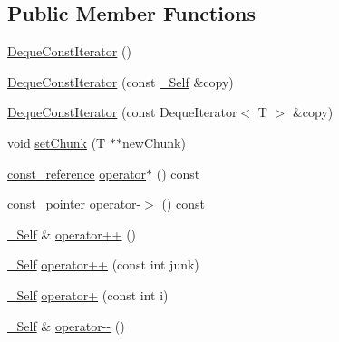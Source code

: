 \subsection*{Public Member Functions}
\begin{DoxyCompactItemize}
\item 
\hyperlink{classprism_1_1containers_1_1_deque_const_iterator_a0fdc71b14e0dac950ade49fad24de22a}{Deque\+Const\+Iterator} ()
\item 
\hyperlink{classprism_1_1containers_1_1_deque_const_iterator_aef88a6f61c853cc8230116a93668550e}{Deque\+Const\+Iterator} (const \hyperlink{classprism_1_1containers_1_1_deque_const_iterator_a5337ff83b02dad8f93642f44af581941}{\+\_\+\+Self} \&copy)
\item 
\hyperlink{classprism_1_1containers_1_1_deque_const_iterator_adac102a94bcb7aab4dd6f9c2f8155d72}{Deque\+Const\+Iterator} (const Deque\+Iterator$<$ T $>$ \&copy)
\item 
void \hyperlink{classprism_1_1containers_1_1_deque_const_iterator_aa5102e6c17efc78b5b8baef4761373fa}{set\+Chunk} (T $\ast$$\ast$new\+Chunk)
\item 
\hyperlink{classprism_1_1containers_1_1_deque_const_iterator_a5e350fb8bacd72830c54e2a419cc2515}{const\+\_\+reference} \hyperlink{classprism_1_1containers_1_1_deque_const_iterator_a4d9b042f506478a7d05f38140906c22a}{operator$\ast$} () const 
\item 
\hyperlink{classprism_1_1containers_1_1_deque_const_iterator_aeee46255ac509f1b2cbe6b70a12e031a}{const\+\_\+pointer} \hyperlink{classprism_1_1containers_1_1_deque_const_iterator_a45896f7a37b0d4b79bfd39c87bc1212b}{operator-\/$>$} () const 
\item 
\hyperlink{classprism_1_1containers_1_1_deque_const_iterator_a5337ff83b02dad8f93642f44af581941}{\+\_\+\+Self} \& \hyperlink{classprism_1_1containers_1_1_deque_const_iterator_a297cf833b9c76114aa3f1a28c893b347}{operator++} ()
\item 
\hyperlink{classprism_1_1containers_1_1_deque_const_iterator_a5337ff83b02dad8f93642f44af581941}{\+\_\+\+Self} \hyperlink{classprism_1_1containers_1_1_deque_const_iterator_a373ebb538525074d24f3cd48dac43abc}{operator++} (const int junk)
\item 
\hyperlink{classprism_1_1containers_1_1_deque_const_iterator_a5337ff83b02dad8f93642f44af581941}{\+\_\+\+Self} \hyperlink{classprism_1_1containers_1_1_deque_const_iterator_a2368dabd68f0bf7636dbec99bd5f9eae}{operator+} (const int i)
\item 
\hyperlink{classprism_1_1containers_1_1_deque_const_iterator_a5337ff83b02dad8f93642f44af581941}{\+\_\+\+Self} \& \hyperlink{classprism_1_1containers_1_1_deque_const_iterator_a1ffceff19234daeeb061bc3765a6d585}{operator-\/-\/} ()
$$
\end{DoxyCompactItemize}
